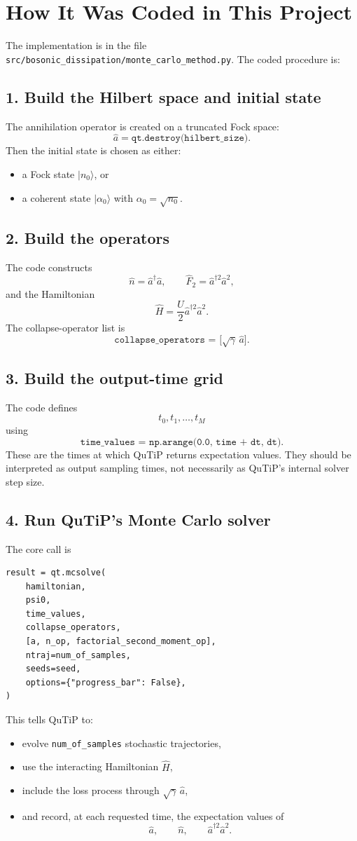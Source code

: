 \documentclass[12pt]{article}
\begin{document}
\section*{How It Was Coded in This Project}
The implementation is in the file \texttt{src/bosonic\_dissipation/monte\_carlo\_method.py}. The coded procedure is:

\subsection*{1. Build the Hilbert space and initial state}
The annihilation operator is created on a truncated Fock space:
\[
\hat a = \texttt{qt.destroy(hilbert\_size)}.
\]
Then the initial state is chosen as either:
\begin{itemize}
\item a Fock state $\lvert n_0\rangle$, or
\item a coherent state $\lvert \alpha_0\rangle$ with $\alpha_0=\sqrt{n_0}$.
\end{itemize}

\subsection*{2. Build the operators}
The code constructs
\[
\hat n = \hat a^\dagger \hat a,
\qquad
\hat F_2 = \hat a^{\dagger 2}\hat a^2,
\]
and the Hamiltonian
\[
\hat H = \frac{U}{2}\hat a^{\dagger 2}\hat a^2.
\]
The collapse-operator list is
\[
\texttt{collapse\_operators = [}\sqrt{\gamma}\,\hat a\texttt{]}.
\]

\subsection*{3. Build the output-time grid}
The code defines
\[
t_0, t_1, \dots, t_M
\]
using
\[
\texttt{time\_values = np.arange(0.0, time + dt, dt)}.
\]
These are the times at which QuTiP returns expectation values. They should be interpreted as output sampling times, not necessarily as QuTiP's internal solver step size.

\subsection*{4. Run QuTiP's Monte Carlo solver}
The core call is
\begin{verbatim}
result = qt.mcsolve(
    hamiltonian,
    psi0,
    time_values,
    collapse_operators,
    [a, n_op, factorial_second_moment_op],
    ntraj=num_of_samples,
    seeds=seed,
    options={"progress_bar": False},
)
\end{verbatim}
This tells QuTiP to:
\begin{itemize}
\item evolve \texttt{num\_of\_samples} stochastic trajectories,
\item use the interacting Hamiltonian $\hat H$,
\item include the loss process through $\sqrt{\gamma}\,\hat a$,
\item and record, at each requested time, the expectation values of
\[
\hat a, \qquad \hat n, \qquad \hat a^{\dagger 2}\hat a^2.
\]
\end{itemize}
\end{document}
